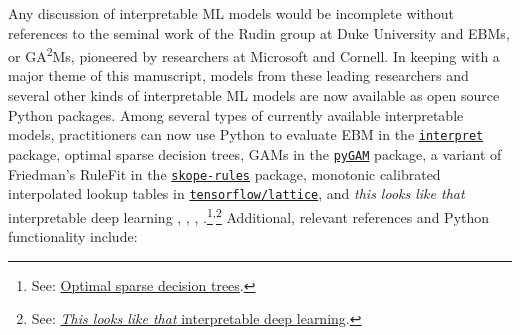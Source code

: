 \documentclass[information,article,submit,moreauthors,pdftex]{definitions/mdpi}
\begin{document}
Any discussion of interpretable ML models would be incomplete without references to the seminal work of the Rudin group at Duke University and EBMs, or GA\textsuperscript{2}Ms, pioneered by researchers at Microsoft and Cornell. In keeping with a major theme of this manuscript, models from these leading researchers and several other kinds of interpretable ML models are now available as open source Python packages. Among several types of currently available interpretable models, practitioners can now use Python to evaluate EBM in the \href{https://github.com/interpretml/interpret}{\texttt{interpret}} package, optimal sparse decision trees, GAMs in the \href{https://github.com/dswah/pyGAM}{\texttt{pyGAM}} package, a variant of Friedman's RuleFit  in the \href{https://github.com/scikit-learn-contrib/skope-rules}{\texttt{skope-rules}} package, monotonic calibrated interpolated lookup tables in \href{https://github.com/tensorflow/lattice}{\texttt{tensorflow/lattice}}, and \textit{this looks like that} interpretable deep learning \cite{osdt}, \cite{rulefit}, \cite{lattice}, \cite{this_looks_like_that}.\footnote{See: \href{https://github.com/xiyanghu/OSDT}{Optimal sparse decision trees}.}\textsuperscript{,}\footnote{See: \href{https://github.com/cfchen-duke/ProtoPNet}{\textit{This looks like that} interpretable deep learning}.} Additional, relevant references and Python functionality include:
\end{document}
